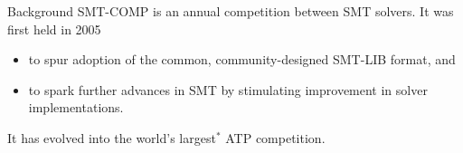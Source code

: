 \documentclass{beamer}
\begin{document}

\begin{frame}{Background}
  SMT-COMP is an annual competition between SMT solvers.
  \vfill
  It was first held in 2005
  \medskip
  \begin{itemize}
  \item to spur adoption of the common, community-designed SMT-LIB
    format, and
    \smallskip
  \item to spark further advances in SMT by stimulating improvement
    in solver implementations.
  \end{itemize}
  \vfill
  It has evolved into the world's largest$^*$ ATP competition.
\end{frame}

\end{document}
